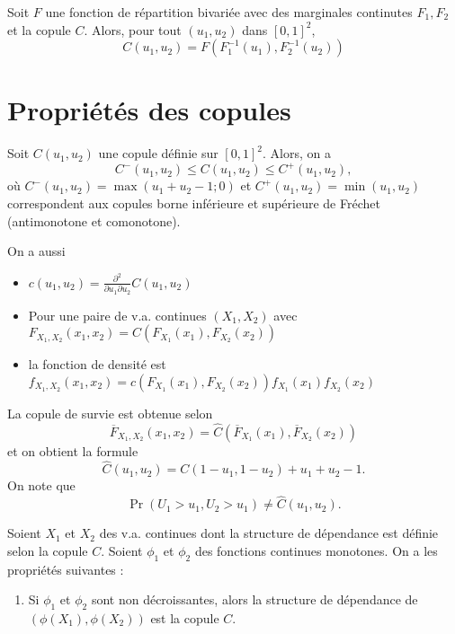 \begin{corollaire}{}{}
	Soit $F$ une fonction de répartition bivariée avec des marginales continutes $F_1, F_2$ et la copule $C$. Alors, pour tout $(u_1, u_2)$ dans $[0, 1]^2$, 
	$$C(u_1, u_2) = F\left(F_1^{-1}(u_1), F_2^{-1}(u_2)\right)$$
\end{corollaire}

\section{Propriétés des copules}

\begin{definition}{}{}
	Soit $C(u_1, u_2)$ une copule définie sur $[0, 1]^2$. Alors, on a 
	$$C^-(u_1, u_2) \leq C(u_1, u_2) \leq C^+(u_1, u_2),$$
	où $C^-(u_1, u_2) = \max(u_1 + u_2 - 1; 0)$ et $C^+(u_1, u_2) = \min(u_1, u_2)$ correspondent aux copules borne inférieure et supérieure de Fréchet (antimonotone et comonotone). 
\end{definition}

On a aussi 
\begin{itemize}
	\item $\displaystyle c(u_1, u_2) = \frac{\partial^2}{\partial u_1 \partial u_2} C(u_1, u_2)$
	\item Pour une paire de v.a. continues $(X_1, X_2)$ avec 
	$ \displaystyle F_{X_1, X_2}(x_1, x_2) = C(F_{X_1}(x_1), F_{X_2}(x_2))$
	\item la fonction de densité est $\displaystyle f_{X_1, X_2}(x_1, x_2) = c(F_{X_1}(x_1), F_{X_2}(x_2))f_{X_1}(x_1)f_{X_2}(x_2)$
\end{itemize}

La copule de survie est obtenue selon 
$$\overline{F}_{X_1, X_2}(x_1, x_2) = \widehat{C}\left(\overline{F}_{X_1}(x_1), \overline{F}_{X_2}(x_2)\right)$$
et on obtient la formule 
$$\widehat{C}(u_1, u_2) = C(1 - u_1, 1 - u_2) + u_1 + u_2 - 1.$$
On note que 
$$\Pr(U_1>u_1, U_2>u_1) \neq \widehat{C}(u_1, u_2).$$

\begin{propriete}{}{}
	Soient $X_1$ et $X_2$ des v.a. continues dont la structure de dépendance est définie selon la copule $C$. Soient $\phi_1$ et $\phi_2$ des fonctions continues monotones. On a les propriétés suivantes : 
	\begin{enumerate}
		\item Si $\phi_1$ et $\phi_2$ sont non décroissantes, alors la structure de dépendance de $(\phi(X_1), \phi(X_2))$ est la copule $C$.  
	\end{enumerate}
\end{propriete}

